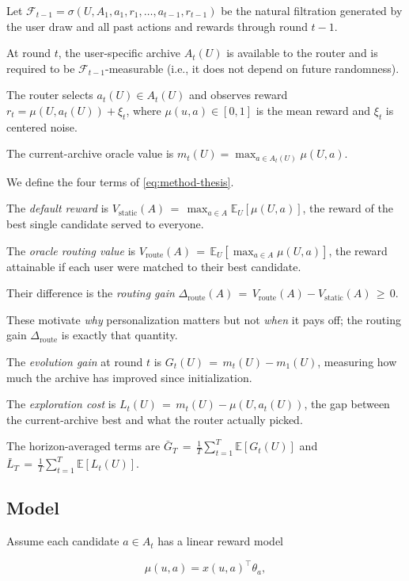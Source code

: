\documentclass{article} %
\providecommand{\E}{\mathbb{E}}
\begin{document}
Let $\mathcal{F}_{t-1} = \sigma(U, A_1, a_1, r_1, \ldots, a_{t-1}, r_{t-1})$ be the natural filtration generated by the user draw and all past actions and rewards through round $t-1$.

At round $t$, the user-specific archive $A_t(U)$ is available to the router and is required to be $\mathcal{F}_{t-1}$-measurable (i.e., it does not depend on future randomness).

The router selects $a_t(U) \in A_t(U)$ and observes reward $r_t = \mu(U, a_t(U)) + \xi_t$, where $\mu(u,a) \in [0,1]$ is the mean reward and $\xi_t$ is centered noise.

The current-archive oracle value is $m_t(U) = \max_{a \in A_t(U)} \mu(U,a)$.

We define the four terms of \eqref{eq:method-thesis}.

The \emph{default reward} is $V_{\mathrm{static}}(A) \,=\, \max_{a \in A} \E_{U}[\mu(U,a)]$, the reward of the best single candidate served to everyone.

The \emph{oracle routing value} is $V_{\mathrm{route}}(A) \,=\, \E_{U}[\max_{a \in A} \mu(U,a)]$, the reward attainable if each user were matched to their best candidate.

Their difference is the \emph{routing gain} $\Delta_{\mathrm{route}}(A) \,=\, V_{\mathrm{route}}(A) - V_{\mathrm{static}}(A) \,\geq\, 0$.

These motivate \emph{why} personalization matters but not \emph{when} it pays off; the routing gain $\Delta_{\mathrm{route}}$ is exactly that quantity.

The \emph{evolution gain} at round $t$ is $G_t(U) \,=\, m_t(U) - m_1(U)$, measuring how much the archive has improved since initialization.

The \emph{exploration cost} is $L_t(U) \,=\, m_t(U) - \mu(U, a_t(U))$, the gap between the current-archive best and what the router actually picked.

The horizon-averaged terms are $\bar G_T \,=\, \frac{1}{T}\sum_{t=1}^T \E[G_t(U)]$ and $\bar L_T \,=\, \frac{1}{T}\sum_{t=1}^T \E[L_t(U)]$.

\subsection{Model}

Assume each candidate $a \in A_t$ has a linear reward model

\[
\mu(u, a) = x(u, a)^\top \theta_a ,
\]
\end{document}
